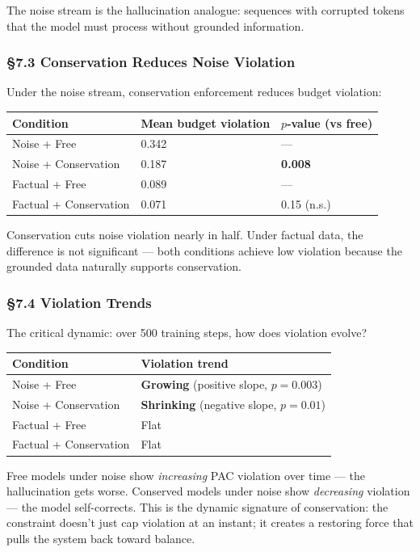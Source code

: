 \documentclass[
  11pt,
  a4paper]{article}
\begin{document}
The noise stream is the hallucination analogue: sequences with corrupted
tokens that the model must process without grounded information.

\subsubsection{§7.3 Conservation Reduces Noise
Violation}\label{conservation-reduces-noise-violation}

Under the noise stream, conservation enforcement reduces budget
violation:

\begin{longtable}[]{@{}lll@{}}
\toprule\noalign{}
Condition & Mean budget violation & \(p\)-value (vs free) \\
\midrule\noalign{}
\endhead
\bottomrule\noalign{}
\endlastfoot
Noise + Free & 0.342 & --- \\
Noise + Conservation & 0.187 & \textbf{0.008} \\
Factual + Free & 0.089 & --- \\
Factual + Conservation & 0.071 & 0.15 (n.s.) \\
\end{longtable}

Conservation cuts noise violation nearly in half. Under factual data,
the difference is not significant --- both conditions achieve low
violation because the grounded data naturally supports conservation.

\subsubsection{§7.4 Violation Trends}\label{violation-trends}

The critical dynamic: over 500 training steps, how does violation
evolve?

\begin{longtable}[]{@{}ll@{}}
\toprule\noalign{}
Condition & Violation trend \\
\midrule\noalign{}
\endhead
\bottomrule\noalign{}
\endlastfoot
Noise + Free & \textbf{Growing} (positive slope, \(p = 0.003\)) \\
Noise + Conservation & \textbf{Shrinking} (negative slope,
\(p = 0.01\)) \\
Factual + Free & Flat \\
Factual + Conservation & Flat \\
\end{longtable}

Free models under noise show \emph{increasing} PAC violation over time
--- the hallucination gets worse. Conserved models under noise show
\emph{decreasing} violation --- the model self-corrects. This is the
dynamic signature of conservation: the constraint doesn't just cap
violation at an instant; it creates a restoring force that pulls the
system back toward balance.
\end{document}

